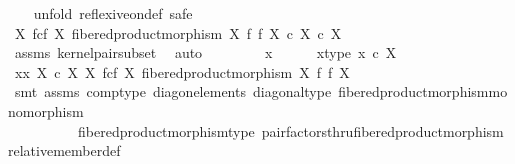 \begin{isabellebody}
\ \ \isamarkupfalse%
\ {\isacharparenleft}{\kern0pt}unfold\ reflexive{\isacharunderscore}{\kern0pt}on{\isacharunderscore}{\kern0pt}def{\isacharcomma}{\kern0pt}\ safe{\isacharparenright}{\kern0pt}\isanewline
\ \ \ \ \isamarkupfalse%
\ {\isachardoublequoteopen}{\isacharparenleft}{\kern0pt}X\ \isactrlbsub f\isactrlesub {\isasymtimes}\isactrlsub c\isactrlbsub f\isactrlesub \ X{\isacharcomma}{\kern0pt}\ fibered{\isacharunderscore}{\kern0pt}product{\isacharunderscore}{\kern0pt}morphism\ X\ f\ f\ X{\isacharparenright}{\kern0pt}\ {\isasymsubseteq}\isactrlsub c\ X\ {\isasymtimes}\isactrlsub c\ X{\isachardoublequoteclose}\isanewline
\ \ \ \ \ \ \isamarkupfalse%
\ assms\ kernel{\isacharunderscore}{\kern0pt}pair{\isacharunderscore}{\kern0pt}subset\ \isamarkupfalse%
\ auto\isanewline
\ \ \isamarkupfalse%
\isanewline
\ \ \ \ \isamarkupfalse%
\ x\isanewline
\ \ \ \ \isamarkupfalse%
\ x{\isacharunderscore}{\kern0pt}type{\isacharcolon}{\kern0pt}\ {\isachardoublequoteopen}x\ {\isasymin}\isactrlsub c\ X{\isachardoublequoteclose}\isanewline
\ \ \ \ \isamarkupfalse%
\ \isamarkupfalse%
\ {\isachardoublequoteopen}{\isasymlangle}x{\isacharcomma}{\kern0pt}x{\isasymrangle}\ {\isasymin}\isactrlbsub X\ {\isasymtimes}\isactrlsub c\ X\isactrlesub \ {\isacharparenleft}{\kern0pt}X\ \isactrlbsub f\isactrlesub {\isasymtimes}\isactrlsub c\isactrlbsub f\isactrlesub \ X{\isacharcomma}{\kern0pt}\ fibered{\isacharunderscore}{\kern0pt}product{\isacharunderscore}{\kern0pt}morphism\ X\ f\ f\ X{\isacharparenright}{\kern0pt}{\isachardoublequoteclose}\isanewline
\ \ \ \ \ \ \isamarkupfalse%
\ {\isacharparenleft}{\kern0pt}smt\ assms\ comp{\isacharunderscore}{\kern0pt}type\ diag{\isacharunderscore}{\kern0pt}on{\isacharunderscore}{\kern0pt}elements\ diagonal{\isacharunderscore}{\kern0pt}type\ fibered{\isacharunderscore}{\kern0pt}product{\isacharunderscore}{\kern0pt}morphism{\isacharunderscore}{\kern0pt}monomorphism\isanewline
\ \ \ \ \ \ \ \ \ \ fibered{\isacharunderscore}{\kern0pt}product{\isacharunderscore}{\kern0pt}morphism{\isacharunderscore}{\kern0pt}type\ pair{\isacharunderscore}{\kern0pt}factorsthru{\isacharunderscore}{\kern0pt}fibered{\isacharunderscore}{\kern0pt}product{\isacharunderscore}{\kern0pt}morphism\ relative{\isacharunderscore}{\kern0pt}member{\isacharunderscore}{\kern0pt}def{}{\isacharparenright}{\kern0pt}\isanewline
\ \ \isamarkupfalse%
\isanewline
\isanewline
\ \ \isamarkupfalse%

\end{isabellebody}
